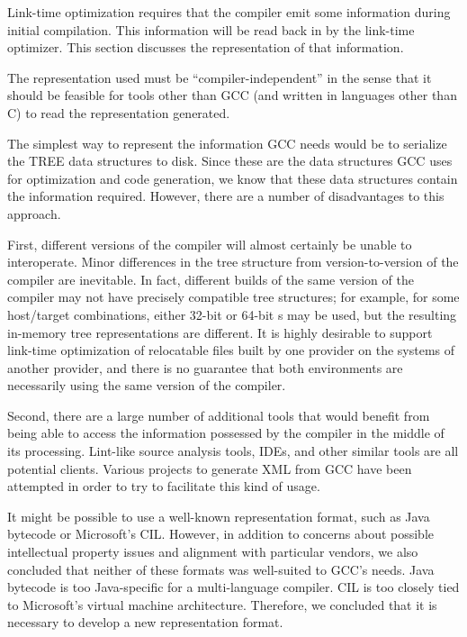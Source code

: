Link-time optimization requires that the compiler emit some
information during initial compilation.  This information will be read
back in by the link-time optimizer.  This section discusses the
representation of that information.

\begin{requirement}
  \label{req:interop}
  The representation used must be ``compiler-independent'' in the
  sense that it should be feasible for tools other than GCC (and
  written in languages other than C) to read the representation
  generated.
\end{requirement}

\begin{rationale}
  The simplest way to represent the information GCC needs would be to
  serialize the TREE data structures to disk.  Since these are the
  data structures GCC uses for optimization and code generation, we
  know that these data structures contain the information required.
  However, there are a number of disadvantages to this approach.

  First, different versions of the compiler will almost certainly be
  unable to interoperate.  Minor differences in the tree structure
  from version-to-version of the compiler are inevitable.  In fact,
  different builds of the same version of the compiler may not have
  precisely compatible tree structures; for example, for some
  host/target combinations, either 32-bit or 64-bit
  s may be used, but the resulting in-memory tree
  representations are different.  It is highly desirable to support
  link-time optimization of relocatable files built by one provider on
  the systems of another provider, and there is no guarantee that both
  environments are necessarily using the same version of the compiler.

  Second, there are a large number of additional tools that would
  benefit from being able to access the information possessed by the
  compiler in the middle of its processing.  Lint-like source analysis
  tools, IDEs, and other similar tools are all potential clients.
  Various projects to generate XML from GCC have been attempted in
  order to try to facilitate this kind of usage.
\end{rationale}

It might be possible to use a well-known representation format, such
as Java bytecode or Microsoft's CIL.  However, in addition to concerns
about possible intellectual property issues and alignment with
particular vendors, we also concluded that neither of these formats
was well-suited to GCC's needs.  Java bytecode is too Java-specific
for a multi-language compiler.  CIL is too closely tied to Microsoft's
virtual machine architecture.  Therefore, we concluded that it is
necessary to develop a new representation format.

